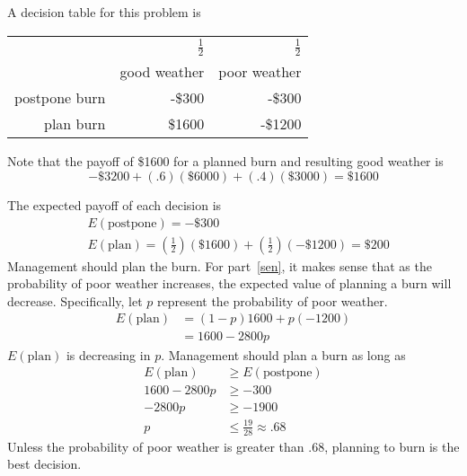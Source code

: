 \begin{solution}
\bs
A decision table for this problem is

\begin{center}
\begin{tabular}{rrr}
    & $\frac{1}{2}$ & $\frac{1}{2}$ \\
    & good weather & poor weather \\ \hline
    postpone burn & -\$300 & -\$300 \\
    plan burn & \$1600 & -\$1200
\end{tabular}
\end{center}

Note that the payoff of \$1600 for a planned burn and resulting good weather is
\[
-\$3200 + (.6)(\$6000) + (.4)(\$3000) = \$1600
\]

The expected payoff of each decision is
\begin{align*}
&E(\text{postpone}) = -\$300 \\
&E(\text{plan}) = \left(\frac{1}{2}\right)(\$1600)
   + \left(\frac{1}{2}\right)(-\$1200) = \$200
\end{align*}
Management should plan the burn. For part~\ref{sen}, it
makes sense that as the probability of poor weather
increases, the expected value of planning a burn will
decrease. Specifically, let $p$ represent the probability
of poor weather.
\begin{align*}
  E(\text{plan}) &= (1-p)1600 + p(-1200) \\
  &= 1600 - 2800p
\end{align*}
$E(\text{plan})$ is decreasing in $p$. Management should
plan a burn as long as
\begin{align*}
  E(\text{plan}) &\geq E(\text{postpone}) \\
  1600 - 2800p &\geq -300 \\
  -2800p &\geq -1900 \\
  p &\leq \frac{19}{28} \approx .68
\end{align*}
Unless the probability of poor weather is greater than .68,
planning to burn is the best decision. 
\end{solution}

